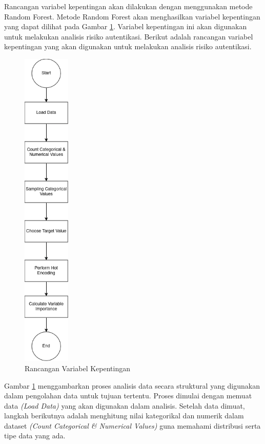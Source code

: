 Rancangan variabel kepentingan akan dilakukan dengan menggunakan metode Random Forest. Metode Random Forest akan menghasilkan variabel kepentingan yang dapat dilihat pada Gambar \ref{fig:variabel-kepentingan}. Variabel kepentingan ini akan digunakan untuk melakukan analisis risiko autentikasi.
Berikut adalah rancangan variabel kepentingan yang akan digunakan untuk melakukan analisis risiko autentikasi.
\begin{figure}[H]
    \centering
    \includegraphics[width=0.2\textwidth]{BAB_TESIS/IMAGES/vim_1.drawio.png}
    \caption{Rancangan Variabel Kepentingan}
    \label{fig:variabel-kepentingan}
\end{figure}

Gambar \ref{fig:variabel-kepentingan} menggambarkan proses analisis data secara struktural yang digunakan dalam pengolahan data untuk tujuan tertentu. Proses dimulai dengan memuat data \textit{(Load Data)} yang akan digunakan dalam analisis. Setelah data dimuat, langkah berikutnya adalah menghitung nilai kategorikal dan numerik dalam dataset \textit{(Count Categorical \& Numerical Values)} guna memahami distribusi serta tipe data yang ada.

